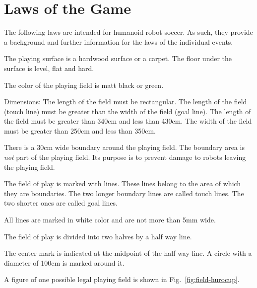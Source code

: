 \documentclass[12pt]{hurocup}
\begin{document}
\section{Laws of the Game}
\label{sec:laws}

The following laws are intended for humanoid robot soccer. As such,
they provide a background and further information for the laws of the
individual events.

\label{law:field-of-play}

\begin{lawlist}
  
\item The playing surface is a hardwood surface or a carpet. The floor
  under the surface is level, flat and hard.

\item The color of the playing field is matt black or green.
  
\item Dimensions: The length of the field must be rectangular. The
  length of the field (touch line) must be greater than the width of
  the field (goal line). The length of the field must be greater than
  340cm and less than 430cm. The width of the field must be greater
  than 250cm and less than 350cm.
 
\item There is a 30cm wide boundary around the playing field. The
  boundary area is \emph{not} part of the playing field. Its purpose
  is to prevent damage to robots leaving the playing field.
 
\item The field of play is marked with lines. These lines belong to
  the area of which they are boundaries. The two longer boundary lines
  are called touch lines. The two shorter ones are called goal lines.

\item All lines are marked in white color and are not more than 5mm
  wide. 

\item The field of play is divided into two halves by a half way
  line. 

\item The center mark is indicated at the midpoint of the half way
  line. A circle with a diameter of 100cm is marked around it.
  
\item A figure of one possible legal playing field is shown in
  Fig.~\ref{fig:field-hurocup}.
  

\end{lawlist}
\end{document}
